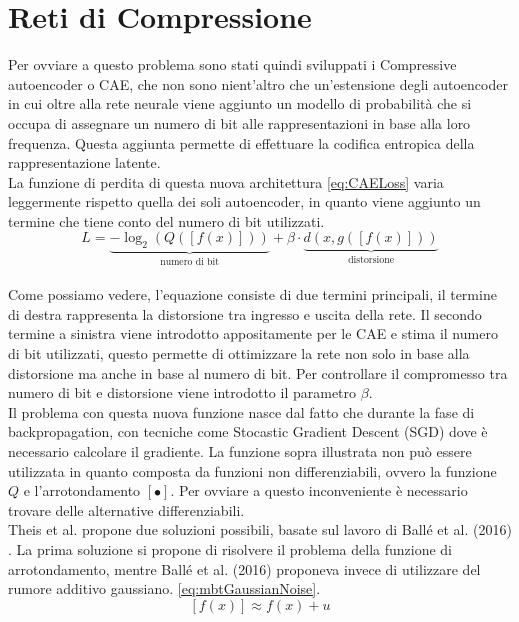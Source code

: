 \section{Reti di Compressione}
Per ovviare a questo problema sono stati quindi sviluppati i Compressive autoencoder o CAE, che non sono nient’altro che un’estensione degli autoencoder in cui oltre alla rete neurale viene aggiunto un modello di probabilità che si occupa di assegnare un numero di bit alle rappresentazioni in base alla loro frequenza. Questa aggiunta permette di effettuare la codifica entropica della rappresentazione latente. \cite{theis2017lossy}\\
La funzione di perdita di questa nuova architettura \ref{eq:CAELoss} varia leggermente rispetto quella dei soli autoencoder, in quanto viene aggiunto un termine che tiene conto del numero di bit utilizzati. 
\begin{equation}\label{eq:CAELoss}
    L = \underbrace{- \log_{2}(Q([f(x)]))}_{\textrm{numero di bit}} + \beta \cdot \underbrace{d(x,g([f(x)]))}_{\textrm{distorsione}}
\end{equation}\\
Come possiamo vedere, l’equazione consiste di due termini principali, il termine di destra rappresenta la distorsione tra ingresso e uscita della rete. Il secondo termine a sinistra viene introdotto appositamente per le CAE e stima il numero di bit utilizzati, questo permette di ottimizzare la rete non solo in base alla distorsione ma anche in base al numero di bit. Per controllare il compromesso tra numero di bit e distorsione viene introdotto il parametro $\beta$.\\
Il problema con questa nuova funzione nasce dal fatto che durante la fase di backpropagation, con tecniche come Stocastic Gradient Descent (SGD) dove è necessario calcolare il gradiente. La funzione sopra illustrata non può essere utilizzata in quanto composta da funzioni non differenziabili, ovvero la funzione $Q$ e l’arrotondamento $[\bullet]$. Per ovviare a questo inconveniente è necessario trovare delle alternative differenziabili.\\
Theis et al. \cite{theis2017lossy} propone due soluzioni possibili, basate sul lavoro di Ballé et al. (2016) \cite{balle2018variational}. La prima soluzione si propone di risolvere il problema della funzione di arrotondamento, mentre Ballé et al. (2016) proponeva invece di utilizzare del rumore additivo gaussiano. \ref{eq:mbtGaussianNoise}.\\
\begin{equation}\label{eq:mbtGaussianNoise}
    [f(x)] \approx f(x) + u
\end{equation}\\
